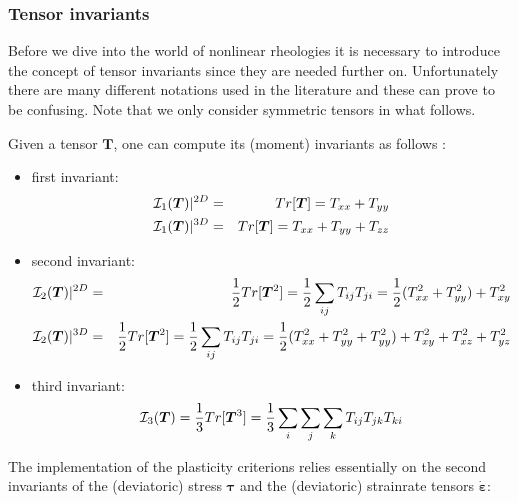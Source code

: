 
\subsubsection{Tensor invariants}\label{sec:invariants}

Before we dive into the world of nonlinear rheologies it is necessary to introduce the concept of tensor 
invariants since they are needed further on. 
Unfortunately there are many different notations used in the literature and these can prove to be 
confusing. Note that we only consider symmetric tensors in what follows.

Given a tensor $\bm{T}$,  one can compute its (moment) invariants as follows \cite[p.339]{reddybook2}: 
\begin{itemize}
\item first invariant:
\begin{eqnarray}
{\cal I}_1({\bm T})|^{2D} &=& Tr[\bm{T}] = T_{xx} + T_{yy} \nonumber\\
{\cal I}_1({\bm T})|^{3D} &=& Tr[\bm{T}] = T_{xx} + T_{yy} + T_{zz} 
\end{eqnarray}
\item second invariant:
\begin{eqnarray}
{\cal I}_2({\bm T})|^{2D} &=& \frac{1}{2} Tr[{\bm{T}^2}] = \frac{1}{2} \sum_{ij} T_{ij} T_{ji} = \frac{1}{2} (T_{xx}^2 + T_{yy}^2) + T_{xy}^2 \nonumber\\
{\cal I}_2({\bm T})|^{3D} &=& \frac{1}{2} Tr[{\bm{T}^2}] = \frac{1}{2} \sum_{ij} T_{ij} T_{ji} = \frac{1}{2} (T_{xx}^2 + T_{yy}^2 + T_{yy}^2) + T_{xy}^2 + T_{xz}^2 + T_{yz}^2 
\end{eqnarray}
\item third invariant: 
\begin{equation}
{\cal I}_3({\bm T}) = \frac{1}{3} Tr[{\bm{T}^3}]  = \frac{1}{3}\sum_i\sum_j \sum_k T_{ij} T_{jk} T_{ki} 
\end{equation}
\end{itemize}


The implementation of the plasticity criterions relies essentially 
on the second invariants of the (deviatoric) stress ${\bm \tau}$ and the (deviatoric) strainrate tensors $\dot{\bm \varepsilon}$:

